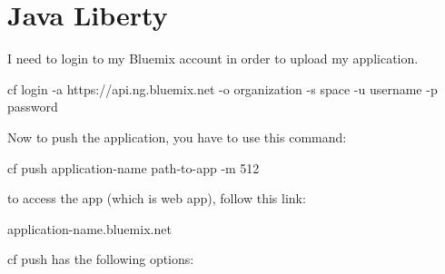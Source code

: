 \documentclass[]{book}
\begin{document}
\section{Java Liberty}
\label{sec:javaliberty}
I need to login to my Bluemix account in order to upload my application. 

\begin{code}
cf login -a https://api.ng.bluemix.net -o organization -s space -u username -p password
\end{code}

Now to push the application, you have to use this command: 
\begin{code}
cf push application-name path-to-app -m 512
\end{code}

to access the app (which is web app), follow this link:
\begin{code}
application-name.bluemix.net
\end{code}








cf push has the following options: 
\end{document}

